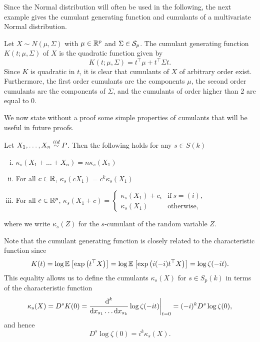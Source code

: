 Since the Normal distribution will often be used in the following, the next example gives the cumulant generating function and cumulants of a multivariate Normal distribution.
\begin{example} \label{ex-cumulants-mvn}
    Let $X \sim N(\mu, \Sigma)$ with $\mu \in {\mathbb{R}^p}$ and $\Sigma \in {\mathcal{S}_p}$. The cumulant generating function $K(t; \mu, \Sigma)$ of $X$ is the quadratic function given by
    \begin{equation*}
        K(t; \mu, \Sigma) = t^\top\mu + t^\top\Sigma t.
    \end{equation*}
    Since $K$ is quadratic in $t$, it is clear that cumulants of $X$ of arbitrary order exist. Furthermore, the first order cumulants are the components $\mu$, the second order cumulants are the components of $\Sigma$, and the cumulants of order higher than 2 are equal to 0.
\end{example}

We now state without a proof some simple properties of cumulants that will be useful in future proofs.
\begin{lemma} \label{lem-cumulants-props}
    Let $X_1, \ldots, X_n \stackrel{iid}{\sim} P$. Then the following holds for any $s \in S(k)$
    \begin{enumerate}[i.]
        \item {
        $\kappa_s(X_1 + \ldots + X_n) = n\kappa_s(X_1)$
        }
        \item {
            For all $c \in \mathbb{R}$, $\kappa_s(c X_1) = c^k\kappa_s(X_1)$
        }
        \item {
            For all $c \in {\mathbb{R}^p}$, $\kappa_s(X_1 + c) =
            \begin{cases}
                \kappa_s(X_1) + c_i &\text{if}\ s=(i),\\
                \kappa_s(X_1)& \text{otherwise},
            \end{cases}$
        }
    \end{enumerate}
    where we write $\kappa_s(Z)$ for the $s$-cumulant of the random variable $Z$.
\end{lemma}

Note that the cumulant generating function is closely related to the characteristic function since
\begin{equation*}
    K(t) 
    = \log \mathbb{E}_{}\left[\exp\left(t^\top X\right)\right] 
    = \log \mathbb{E}_{}\left[\exp\left(i (-i)t^\top X\right)\right]
    = \log \zeta(-it).
\end{equation*}
This equality allows us to define the cumulants $\kappa_s(X)$ for $s \in S_p(k)$ in terms of the characteristic function
\begin{equation*}
    \kappa_s(X) = D^s K(0) 
    = \frac{\text{d}^k}{\text{d} x_{s_1} \ldots \text{d} x_{s_k}} \log \zeta(-it) \bigg|_{t=0}
    = (-i)^{k} D^s \log \zeta(0),
\end{equation*}
and hence
\begin{equation*}
    D^s \log \zeta(0) = i^k \kappa_s(X).
\end{equation*}